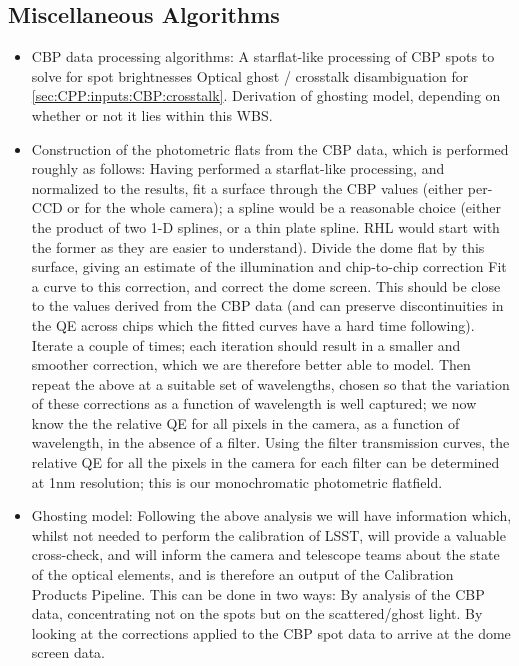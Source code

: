 

\subsection{Miscellaneous Algorithms}\label{sec:CPP:miscAlg}
\begin{itemize}
	\item CBP data processing algorithms:
	\mysubitem A starflat-like processing of CBP spots to solve for spot brightnesses
	\mysubitem Optical ghost / crosstalk disambiguation for \secsymbol\ref{sec:CPP:inputs:CBP:crosstalk}.
	\mysubitem Derivation of ghosting model, depending on whether or not it lies within this WBS.
	\item Construction of the photometric flats from the CBP data, which is performed roughly as follows:
	\mysubitem Having performed a starflat-like processing, and normalized to the results, fit a surface through the CBP values (either per-CCD or for the whole camera); a spline would be a reasonable choice (either the product of two 1-D splines, or a thin plate spline. RHL would start with the former as they are easier to understand).
	\mysubitem Divide the dome flat by this surface, giving an estimate of the illumination and chip-to-chip correction
	\mysubitem Fit a curve to this correction, and correct the dome screen.  This should be close to the values derived from the CBP data (and can preserve discontinuities in the QE across chips which the fitted curves have a hard time following).
	\mysubitem Iterate a couple of times; each iteration should result in a smaller and smoother correction, which we are therefore better able to model.
	\mysubitem Then repeat the above at a suitable set of wavelengths, chosen so that the variation of these corrections as a function of wavelength is well captured; we now know the the relative QE for all pixels in the camera, as a function of wavelength, in the absence of a filter.
	\mysubitem Using the filter transmission curves, the relative QE for all the pixels in the camera for each filter can be determined at 1nm resolution; this is our monochromatic photometric flatfield.
	\item Ghosting model: Following the above analysis we will have information which, whilst not needed to perform the calibration of LSST, will provide a valuable cross-check, and will inform the camera and telescope teams about the state of the optical elements, and is therefore an output of the Calibration Products Pipeline. This can be done in two ways:
	\mysubitem By analysis of the CBP data, concentrating not on the spots but on the scattered/ghost light.
	\mysubitem By looking at the corrections applied to the CBP spot data to arrive at the dome screen data.
\end{itemize}




